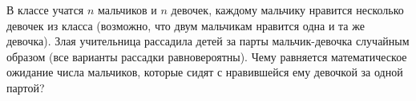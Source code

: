 В классе учатся $n$ мальчиков и $n$ девочек, каждому мальчику нравится несколько девочек из класса (возможно, что двум
мальчикам нравится одна и та же девочка). Злая учительница рассадила детей за парты мальчик-девочка случайным образом (все
варианты рассадки равновероятны). Чему равняется математическое ожидание числа мальчиков, которые сидят с нравившейся ему
девочкой за одной партой?